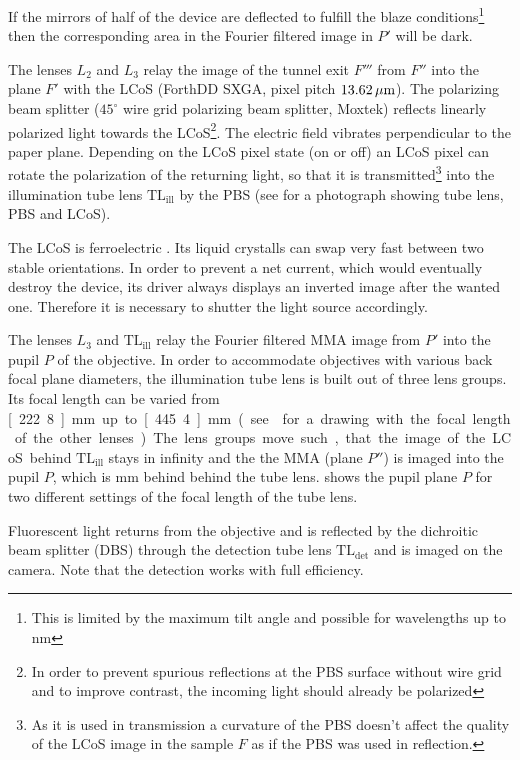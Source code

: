 If the mirrors of half of the device are deflected to fulfill the
blaze conditions\footnote{This is limited by the maximum tilt angle
  and possible for wavelengths up to \unit[800]{nm}} then the
corresponding area in the Fourier filtered image in $P'$ will be dark.

The lenses $L_2$ and $L_3$ relay the image of the tunnel exit $F'''$
from $F''$ into the plane $F'$ with the LCoS (ForthDD SXGA, pixel
pitch $\unit[13.62]{\mu m}$). The polarizing beam splitter ($45^\circ$
wire grid polarizing beam splitter, Moxtek) reflects linearly
polarized light towards the LCoS\footnote{In order to prevent spurious
  reflections at the PBS surface without wire grid and to improve
  contrast, the incoming light should already be polarized}. The
electric field vibrates perpendicular to the paper plane. Depending on
the LCoS pixel state (on or off) an LCoS pixel can rotate the
polarization of the returning light, so that it is
transmitted\footnote{As it is used in transmission a curvature of the
  PBS doesn't affect the quality of the LCoS image in the sample $F$
  as if the PBS was used in reflection.}  into the illumination tube
lens $\textrm{TL}_\textrm{ill}$ by the PBS (see  for
a photograph showing tube lens, PBS and LCoS).

The LCoS is ferroelectric \citetext{\citealp[see][]{1991Saleh} and
\citealp[p.~192]{Goodman1996}}.  Its liquid crystalls can swap very fast
between two stable orientations. In order to prevent a net current,
which would eventually destroy the device, its driver always displays
an inverted image after the wanted one. Therefore it is necessary to
shutter the light source accordingly.

The lenses $L_3$ and $\textrm{TL}_\textrm{ill}$ relay the Fourier
filtered MMA image from $P'$ into the pupil $P$ of the objective. In
order to accommodate objectives with various back focal plane
diameters, the illumination tube lens is built out of three lens
groups. Its focal length can be varied from \unit[222.8]{mm} up to
\unit[445.4]{mm} (see  for a drawing with the
focal length of the other lenses). The lens groups move such, that the
image of the LCoS behind $\textrm{TL}_\textrm{ill}$ stays in infinity
and the the MMA (plane $P''$) is imaged into the pupil $P$, which is
\unit[250]{mm} behind behind the tube lens. 
shows the pupil plane $P$ for two different settings of the focal
length of the tube lens.

Fluorescent light returns from the objective and is reflected by the
dichroitic beam splitter (DBS) through the detection tube lens
$\textrm{TL}_\textrm{det}$ and is imaged on the camera. Note that the
detection works with full efficiency.

